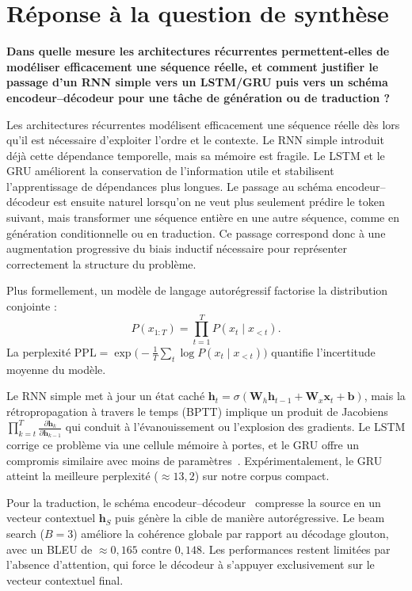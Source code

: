 \section{Réponse à la question de synthèse}
\textbf{Dans quelle mesure les architectures récurrentes permettent-elles de modéliser efficacement une séquence réelle, et comment justifier le passage d’un RNN simple vers un LSTM/GRU puis vers un schéma encodeur--décodeur pour une tâche de génération ou de traduction ?}

Les architectures récurrentes modélisent efficacement une séquence réelle dès lors qu'il est nécessaire d'exploiter l'ordre et le contexte. Le RNN simple introduit déjà cette dépendance temporelle, mais sa mémoire est fragile. Le LSTM et le GRU améliorent la conservation de l'information utile et stabilisent l'apprentissage de dépendances plus longues. Le passage au schéma encodeur--décodeur est ensuite naturel lorsqu'on ne veut plus seulement prédire le token suivant, mais transformer une séquence entière en une autre séquence, comme en génération conditionnelle ou en traduction. Ce passage correspond donc à une augmentation progressive du biais inductif nécessaire pour représenter correctement la structure du problème.

Plus formellement, un modèle de langage autorégressif factorise la distribution conjointe :
\[
    P(x_{1:T}) = \prod_{t=1}^{T} P(x_t \mid x_{<t}).
\]
La perplexité $\mathrm{PPL} = \exp\!\bigl(-\frac{1}{T}\sum_{t}\log P(x_t \mid x_{<t})\bigr)$
quantifie l'incertitude moyenne du modèle.

Le RNN simple met à jour un état caché $\mathbf{h}_t = \sigma(\mathbf{W}_h \mathbf{h}_{t-1} + \mathbf{W}_x \mathbf{x}_t + \mathbf{b})$, mais la rétropropagation à travers le temps (BPTT) implique un produit de Jacobiens $\prod_{k=t}^{T} \frac{\partial \mathbf{h}_{k}}{\partial \mathbf{h}_{k-1}}$ qui conduit à l'évanouissement ou l'explosion des gradients. Le LSTM corrige ce problème via une cellule mémoire à portes, et le GRU offre un compromis similaire avec moins de paramètres~\citep{cho2014learning}. Expérimentalement, le GRU atteint la meilleure perplexité ($\approx 13{,}2$) sur notre corpus compact.

Pour la traduction, le schéma encodeur--décodeur~\citep{sutskever2014sequence} compresse la source en un vecteur contextuel $\mathbf{h}_S$ puis génère la cible de manière autorégressive. Le beam search ($B = 3$) améliore la cohérence globale par rapport au décodage glouton, avec un BLEU de $\approx 0{,}165$ contre $0{,}148$. Les performances restent limitées par l'absence d'attention, qui force le décodeur à s'appuyer exclusivement sur le vecteur contextuel final.
